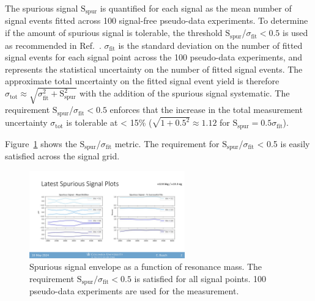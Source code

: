 The spurious signal $\text{S}_{\text{spur}}$ is quantified for each signal as the mean number of signal events fitted across 100 signal-free pseudo-data experiments. 
To determine if the amount of spurious signal is tolerable, the threshold $\text{S}_{\text{spur}}$/$\sigma_{\text{fit}} < 0.5$ is used as recommended in Ref.~\cite{smooth_bkg}.
$\sigma_{\text{fit}}$ is the standard deviation on the number of fitted signal events for each signal point across the 100 pseudo-data experiments, and represents the statistical uncertainty on the number of fitted signal events.
The approximate total uncertainty on the fitted signal event yield is therefore $\sigma_\text{tot} \approx \sqrt{\sigma_\text{fit}^2 + \text{S}_\text{spur}^2}$ with the addition of the spurious signal systematic.
The requirement $\text{S}_{\text{spur}}$/$\sigma_{\text{fit}} < 0.5$ enforces that the increase in the total measurement uncertainty $\sigma_\text{tot}$ is tolerable at < 15\% ($\sqrt{1+0.5^2} \approx 1.12$ for $\text{S}_{\text{spur}} = 0.5\sigma_\text{fit}$).


Figure~\ref{fig:spursig} shows the $\text{S}_{\text{spur}}$/$\sigma_{\text{fit}}$ metric.
The requirement for $\text{S}_{\text{spur}}$/$\sigma_{\text{fit}}$ < 0.5 is easily satisfied across the signal grid.
\begin{figure}[!htbp]
\centering
   \includegraphics[width=0.6\textwidth]{figures/systs/spursig}
    \caption{Spurious signal envelope as a function of resonance mass. The requirement $\text{S}_\text{spur}/\sigma_\text{fit} <0.5$ is satisfied for all signal points. 100 pseudo-data experiments are used for the measurement.
    \label{fig:spursig}}
\end{figure}



